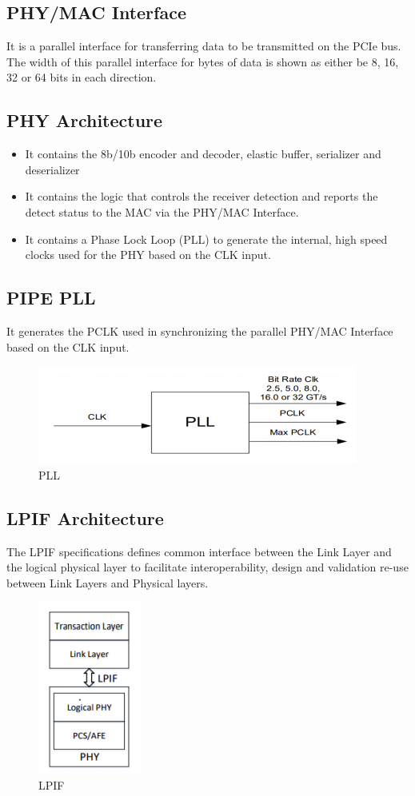 \subsection{PHY/MAC Interface}
It is a parallel interface for transferring data to be transmitted on the PCIe bus.
The width of this parallel interface for bytes of data is shown as either be 8, 16, 32
or 64 bits in each direction.
\subsection{PHY Architecture}
\begin{itemize}
    \item It contains the 8b/10b encoder and decoder, elastic buffer, serializer and deserializer
    \item It contains the logic that controls the receiver detection and reports the detect
status to the MAC via the PHY/MAC Interface.
    \item It contains a Phase Lock Loop (PLL) to generate the internal, high speed clocks
used for the PHY based on the CLK input.
\end{itemize}
\subsection{PIPE PLL}
It generates the PCLK used in synchronizing the parallel PHY/MAC Interface based on the
CLK input.

\begin{figure}[H]
  \centering
  \includegraphics{images/pll.png}
  \caption{PLL}
  \label{lane}
\end{figure}

\subsection{LPIF Architecture}
The LPIF specifications defines common interface between the Link Layer and the logical
physical layer to facilitate interoperability, design and validation re-use between Link
Layers and Physical layers.
\begin{figure}[H]
  \centering
  \includegraphics{images/lpif.png}
  \caption{LPIF}
  \label{lane}
\end{figure}

